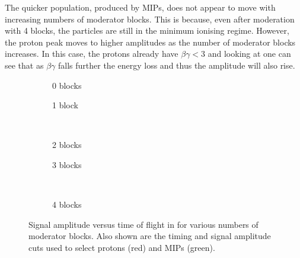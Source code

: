 The quicker population, produced by MIPs, does not appear to move with increasing numbers of moderator blocks.
This is because, even after moderation with 4 blocks, the particles are still in the minimum ionising regime.
However, the proton peak moves to higher amplitudes as the number of moderator blocks increases.
In this case, the protons already have $\beta\gamma < 3$ and looking at  one can see that as $\beta\gamma$ falls further the energy loss and thus the amplitude will also rise.

\begin{figure}[t]
  \begin{subfigure}[t]{.5\textwidth}
    \begin{adjustbox}{max totalsize=\textwidth, center}
      
    \end{adjustbox}
    \caption{0 blocks}
    \label{fig:tvsa:0}
  \end{subfigure}
  \hfill
  \begin{subfigure}[t]{.5\textwidth}
    \begin{adjustbox}{max totalsize=\textwidth, center}
            
    \end{adjustbox}
    \caption{1 block}
  \end{subfigure} \\
  \begin{subfigure}[t]{.5\textwidth}
    \begin{adjustbox}{max totalsize=\textwidth, center}
      
    \end{adjustbox}
    \caption{2 blocks}
  \end{subfigure}
  \hfill
  \begin{subfigure}[t]{.5\textwidth}
    \begin{adjustbox}{max totalsize=\textwidth, center}
      
    \end{adjustbox}
    \caption{3 blocks}
  \end{subfigure} \\

  \begin{subfigure}[t]{\textwidth}
    \begin{adjustbox}{max totalsize=.5\textwidth, center}
      
    \end{adjustbox}
    \caption{4 blocks}
  \end{subfigure}

  \caption[Signal amplitude versus time of flight in \SThree]{Signal amplitude versus time of flight in \SThree for various numbers of moderator blocks. Also shown are the timing and signal amplitude cuts used to select protons (red) and MIPs (green).}
  \label{fig:tvsa}
\end{figure}

